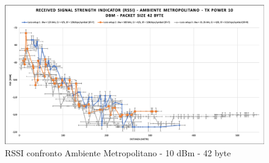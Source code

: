 \documentclass[12pt,a4paper,openright,twoside]{report}
\begin{document}
\begin{figure}[h]                      
\begin{center} 
\includegraphics[width=\textwidth]{RSSI_confronto_AM-10dBm-42byte.png}
\caption[RSSI confronto Ambiente Metropolitano - 10 dBm - 42 byte]{RSSI confronto Ambiente Metropolitano - 10 dBm - 42 byte}\label{fig:prima}
\end{center}
\end{figure}
\end{document}

